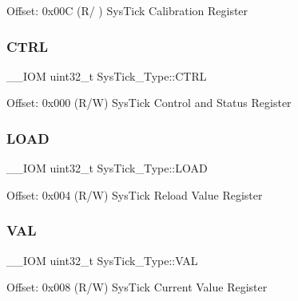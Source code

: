 Offset\+: 0x00C (R/ ) Sys\+Tick Calibration Register \mbox{\label{struct_sys_tick___type_a875e7afa5c4fd43997fb544a4ac6e37e}} 
\subsubsection{\texorpdfstring{CTRL}{CTRL}}
{\footnotesize\ttfamily \+\_\+\+\_\+\+I\+OM uint32\+\_\+t Sys\+Tick\+\_\+\+Type\+::\+C\+T\+RL}

Offset\+: 0x000 (R/W) Sys\+Tick Control and Status Register \mbox{\label{struct_sys_tick___type_a4780a489256bb9f54d0ba8ed4de191cd}} 
\subsubsection{\texorpdfstring{LOAD}{LOAD}}
{\footnotesize\ttfamily \+\_\+\+\_\+\+I\+OM uint32\+\_\+t Sys\+Tick\+\_\+\+Type\+::\+L\+O\+AD}

Offset\+: 0x004 (R/W) Sys\+Tick Reload Value Register \mbox{\label{struct_sys_tick___type_a9b5420d17e8e43104ddd4ae5a610af93}} 
\subsubsection{\texorpdfstring{VAL}{VAL}}
{\footnotesize\ttfamily \+\_\+\+\_\+\+I\+OM uint32\+\_\+t Sys\+Tick\+\_\+\+Type\+::\+V\+AL}

Offset\+: 0x008 (R/W) Sys\+Tick Current Value Register 

